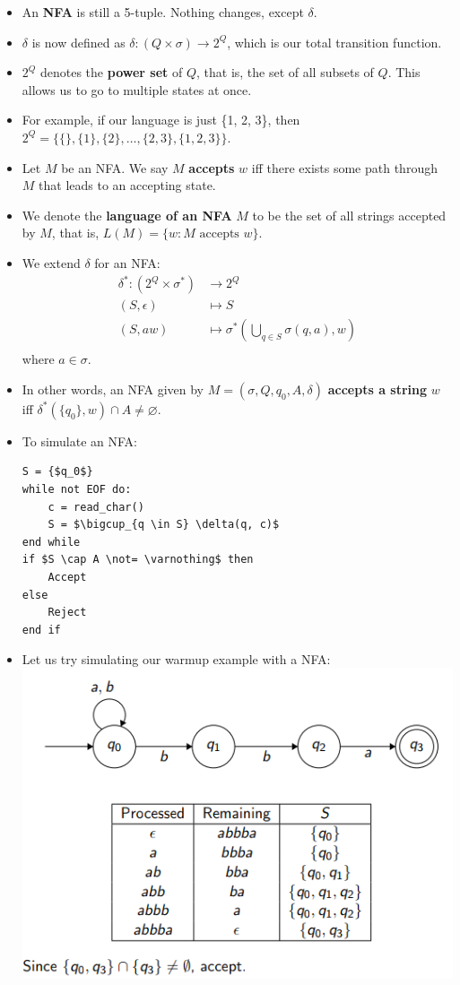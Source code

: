 \documentclass[12pt]{article}
\begin{document}
\begin{itemize}
    \item An \textbf{NFA} is still a 5-tuple.  Nothing changes, except $\delta$.
    \item $\delta$ is now defined as $\delta : (Q \times \sigma) \rightarrow 2^Q$, which is our total transition function.
    \item $2^Q$ denotes the \textbf{power set} of $Q$, that is, the set of all subsets of $Q$.  This allows us to  go to multiple states at once.
    \item For example, if our language is just \{1, 2, 3\}, then $2^Q = \{\{\}, \{1\}, \{2\}, \dots ,\{2, 3\}, \{1, 2, 3\}\}$.
    \item Let $M$ be an NFA.  We say $M$ \textbf{accepts} $w$ iff there exists some path through $M$ that leads to an accepting state.
    \item We denote the \textbf{language of an NFA} $M$ to be the set of all strings accepted by $M$, that is, $L(M) = \{w : M \text{ accepts } w\}$.
    \item We extend $\delta$ for an NFA:
        \begin{align*}
            \delta^* : (2^Q \times \sigma^*) &\rightarrow 2^Q \\
            (S, \epsilon) &\mapsto S \\
            (S, aw) &\mapsto \sigma^* (\bigcup_{q \in S} \sigma(q, a), w) \\
        \end{align*}
            where $a \in \sigma$.  
    \item In other words, an NFA given by $M = (\sigma, Q, q_0, A, \delta)$ \textbf{accepts a string} $w$ iff $\delta^*(\{q_0\}, w) \cap A \not= \varnothing$.
    \item To simulate an NFA:
        \begin{lstlisting}[mathescape, numbers=none, breaklines=true]
S = {$q_0$}
while not EOF do:
    c = read_char()
    S = $\bigcup_{q \in S} \delta(q, c)$
end while
if $S \cap A \not= \varnothing$ then
    Accept
else
    Reject
end if
        \end{lstlisting}
    \item Let us try simulating our warmup example with a NFA:\\
        \includegraphics[scale=0.5]{simu.png} \\
\end{itemize}
\end{document}
